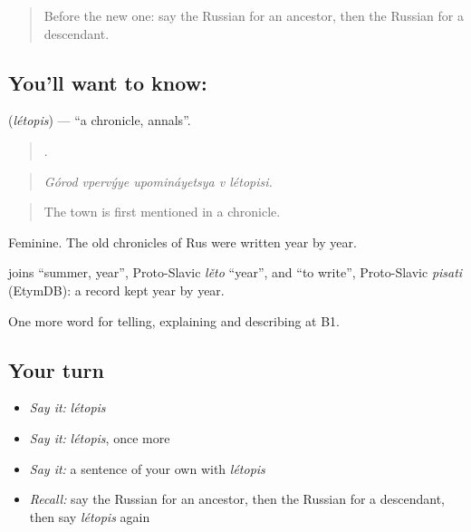 \label{lesson:RU-C326-letopis}



\begin{quote}
Before the new one: say the Russian for an ancestor, then the Russian for a descendant.
\end{quote}

\subsection*{You'll want to know: }
\textbf{} (\emph{létopis}) — \textquotedblleft{}a chronicle, annals\textquotedblright{}.

\begin{quote}
    .
\end{quote}

\begin{quote}
\emph{Górod vpervýye upomináyetsya v létopisi.}
\end{quote}

\begin{quote}
The town is first mentioned in a chronicle.
\end{quote}

Feminine. The old chronicles of Rus were written year by year.

\begin{cousinweb}
\emph{} joins \emph{} \textquotedblleft{}summer, year\textquotedblright{}, Proto-Slavic \emph{lěto} \textquotedblleft{}year\textquotedblright{}, and \emph{} \textquotedblleft{}to write\textquotedblright{}, Proto-Slavic \emph{pisati} (EtymDB): a record kept year by year.
\end{cousinweb}

\begin{grammarlens}[title={What you've built}]
One more word for telling, explaining and describing at B1.
\end{grammarlens}

\subsection*{Your turn}
\begin{itemize}
\raggedright
  \item \emph{Say it:} \emph{létopis}
  \item \emph{Say it:} \emph{létopis}, once more
  \item \emph{Say it:} a sentence of your own with \emph{létopis}
  \item \emph{Recall:} say the Russian for an ancestor, then the Russian for a descendant, then say \emph{létopis} again
\end{itemize}

